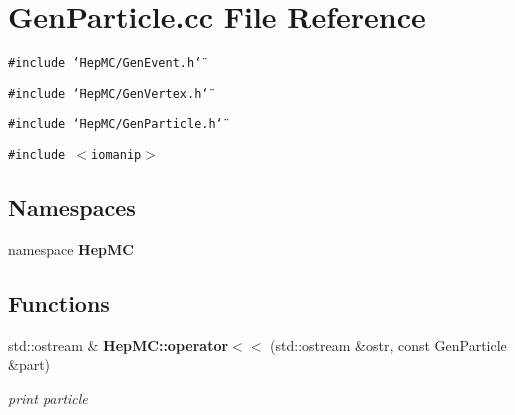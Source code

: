 \section{Gen\-Particle.cc File Reference}
\label{GenParticle_8cc}
{\tt \#include \char`\"{}Hep\-MC/Gen\-Event.h\char`\"{}}\par
{\tt \#include \char`\"{}Hep\-MC/Gen\-Vertex.h\char`\"{}}\par
{\tt \#include \char`\"{}Hep\-MC/Gen\-Particle.h\char`\"{}}\par
{\tt \#include $<$iomanip$>$}\par
\subsection*{Namespaces}
\begin{CompactItemize}
\item 
namespace {\bf Hep\-MC}
\end{CompactItemize}
\subsection*{Functions}
\begin{CompactItemize}
\item 
std::ostream \& {\bf Hep\-MC::operator$<$$<$} (std::ostream \&ostr, const Gen\-Particle \&part)
\begin{CompactList}\small\item\em print particle \item\end{CompactList}\end{CompactItemize}
